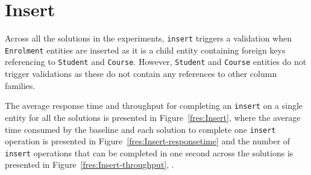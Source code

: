 \section{Insert} \label{s:results-insert}
Across all the solutions in the experiments,  \texttt{insert}  triggers a
validation when \texttt{Enrolment} entities are inserted as it is a child entity
containing foreign keys referencing to \texttt{Student} and \texttt{Course}.
However, \texttt{Student} and \texttt{Course} entities do not trigger
validations as these do not contain any references to other column families. 

The average response time and throughput for completing an \texttt{insert} on a
single entity for all the solutions is presented in Figure~\ref{fres:Insert}, 
where  the average time consumed by the baseline and each solution to complete one \texttt{insert} operation is presented in 
Figure~\ref{fres:Insert-responsetime} and 
 the number of \texttt{insert}
operations that can be completed in one second across the solutions is
presented in  Figure~\ref{fres:Insert-throughput}, .

